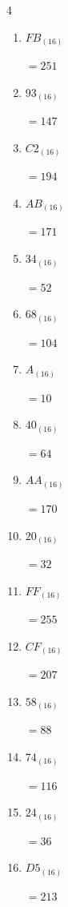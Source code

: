 \begin{multicols}{4}
\begin{enumerate}
        $=25$

  \item $FB_{(16)}$

        $=251$

  \item $93_{(16)}$

        $=147$

  \item $C2_{(16)}$

        $=194$

  \item $AB_{(16)}$

        $=171$

  \item $34_{(16)}$

        $=52$

  \item $68_{(16)}$

        $=104$

\columnbreak %

  \item $A_{(16)}$

        $=10$

  \item $40_{(16)}$

        $=64$

  \item $AA_{(16)}$

        $=170$

  \item $20_{(16)}$

        $=32$

  \item $FF_{(16)}$

        $=255$

  \item $CF_{(16)}$

        $=207$

  \item $58_{(16)}$

        $=88$

  \item $74_{(16)}$

        $=116$

  \item $24_{(16)}$

        $=36$

  \item $D5_{(16)}$

        $=213$


\end{enumerate}
\end{multicols}

